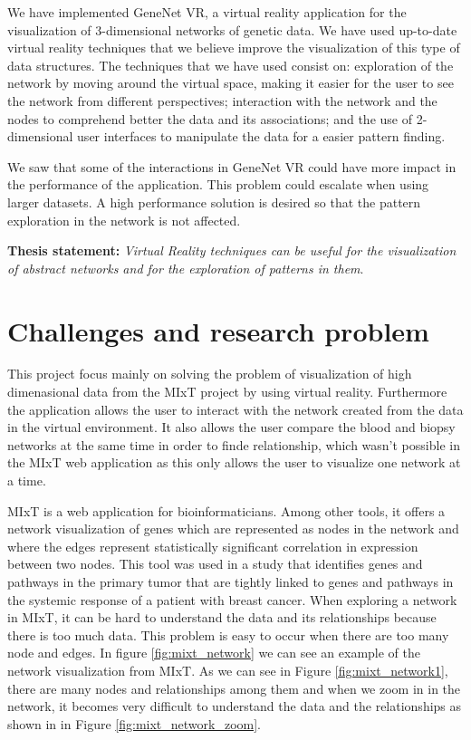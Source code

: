 We have implemented GeneNet VR, a virtual reality application for the visualization of 3-dimensional networks of genetic data. We have used up-to-date virtual reality techniques that we believe improve the visualization of this type of data structures. The techniques that we have used consist on: exploration of the network by moving around the virtual space, making it easier for the user to see the network from different perspectives; interaction with the network and the nodes to comprehend better the data and its associations; and the use of 2-dimensional user interfaces to manipulate the data for a easier pattern finding.

We saw that some of the interactions in GeneNet VR could have more impact in the performance of the application. This problem could escalate when using larger datasets. A high performance solution is desired so that the pattern exploration in the network is not affected.

\textbf{Thesis statement: } \emph{Virtual Reality techniques can be useful for the visualization of abstract networks and for the exploration of patterns in them}.

\section{Challenges and research problem}
This project focus mainly on solving the problem of visualization of high dimenasional data from the MIxT project by using virtual reality. Furthermore the application allows the user to interact with the network created from the data in the virtual environment. It also allows the user compare the blood and biopsy networks at the same time in order to finde relationship, which wasn't possible in the MIxT web application as this only allows the user to visualize one network at a time.

MIxT\cite{fjukstad_dumeaux_olsen_lund_hallett_bongo_2017} is a web application for bioinformaticians. Among other tools, it offers a network visualization of genes which are represented as nodes in the network and where the edges represent statistically significant correlation in expression between two nodes. This tool was used in a study\cite{dumeaux_fjukstad_interactions_tumor_blood} that identifies genes and pathways in the primary tumor that are tightly linked to genes and pathways in the systemic response of a patient with breast cancer.
When exploring a network in MIxT, it can be hard to understand the data and its relationships because there is too much data. This problem is easy to occur when there are too many node and edges. In figure \ref{fig:mixt_network} we can see an example of the network visualization from MIxT. As we can see in Figure \ref{fig:mixt_network1}, there are many nodes and relationships among them and when we zoom in in the network, it becomes very difficult to understand the data and the relationships as shown in in Figure \ref{fig:mixt_network_zoom}.

